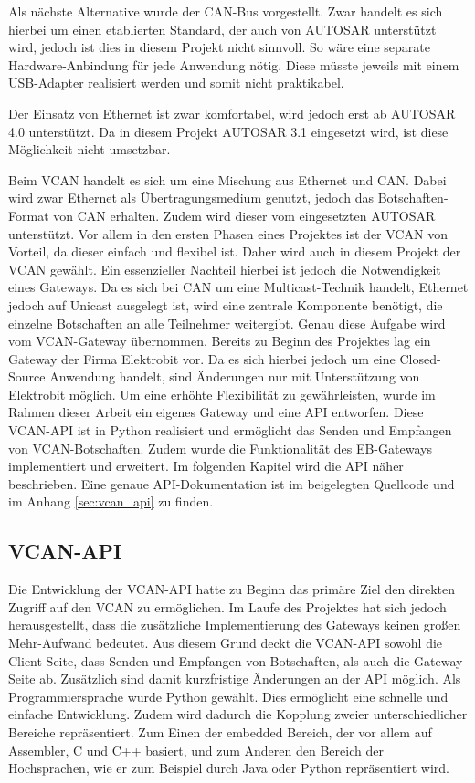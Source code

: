 \documentclass[
  a4paper,					    %
  twoside,
  DIV=calc,     				%
  bibliography=totoc,
  cleardoublepage=empty,
  ngerman,     					%
  final       					%
]{scrbook}
\begin{document}
Als nächste Alternative wurde der CAN-Bus vorgestellt. Zwar handelt es sich hierbei um einen etablierten Standard, der auch von AUTOSAR unterstützt wird, jedoch ist dies in diesem Projekt nicht sinnvoll. So wäre eine separate Hardware-Anbindung für jede Anwendung nötig. Diese müsste jeweils mit einem USB-Adapter realisiert werden und somit nicht praktikabel.

Der Einsatz von Ethernet ist zwar komfortabel, wird jedoch erst ab AUTOSAR 4.0 unterstützt. Da in diesem Projekt AUTOSAR 3.1 eingesetzt wird, ist diese Möglichkeit nicht umsetzbar.

Beim VCAN handelt es sich um eine Mischung aus Ethernet und CAN. Dabei wird zwar Ethernet als Übertragungsmedium genutzt, jedoch das Botschaften-Format von CAN erhalten. Zudem wird dieser vom eingesetzten AUTOSAR unterstützt. Vor allem in den ersten Phasen eines Projektes ist der VCAN von Vorteil, da dieser einfach und flexibel ist. Daher wird auch in diesem Projekt der VCAN gewählt. Ein essenzieller Nachteil hierbei ist jedoch die Notwendigkeit eines Gateways. Da es sich bei CAN um eine Multicast-Technik handelt, Ethernet jedoch auf Unicast ausgelegt ist, wird eine zentrale Komponente benötigt, die einzelne Botschaften an alle Teilnehmer weitergibt. Genau diese Aufgabe wird vom VCAN-Gateway übernommen. Bereits zu Beginn des Projektes lag ein Gateway der Firma Elektrobit vor. Da es sich hierbei jedoch um eine Closed-Source Anwendung handelt, sind Änderungen nur mit Unterstützung von Elektrobit möglich. Um eine erhöhte Flexibilität zu gewährleisten, wurde im Rahmen dieser Arbeit ein eigenes Gateway und eine API entworfen. Diese VCAN-API ist in Python realisiert und ermöglicht das Senden und Empfangen von VCAN-Botschaften. Zudem wurde die Funktionalität des EB-Gateways implementiert und erweitert. Im folgenden Kapitel wird die API näher beschrieben. Eine genaue API-Dokumentation ist im beigelegten Quellcode und im Anhang \ref{sec:vcan_api} zu finden.


\subsection{VCAN-API}
\label{sec:VCAN_API}
Die Entwicklung der VCAN-API hatte zu Beginn das primäre Ziel den direkten Zugriff auf den VCAN zu ermöglichen. Im Laufe des Projektes hat sich jedoch herausgestellt, dass die zusätzliche Implementierung des Gateways keinen großen Mehr-Aufwand bedeutet. Aus diesem Grund deckt die VCAN-API sowohl die Client-Seite, dass Senden und Empfangen von Botschaften, als auch die Gateway-Seite ab. Zusätzlich sind damit kurzfristige Änderungen an der API möglich. Als Programmiersprache wurde Python gewählt. Dies ermöglicht eine schnelle und einfache Entwicklung. Zudem wird dadurch die Kopplung zweier unterschiedlicher Bereiche repräsentiert. Zum Einen der embedded Bereich, der vor allem auf Assembler, C und C++ basiert, und zum Anderen den Bereich der Hochsprachen, wie er zum Beispiel durch Java oder Python repräsentiert wird.
\end{document}
